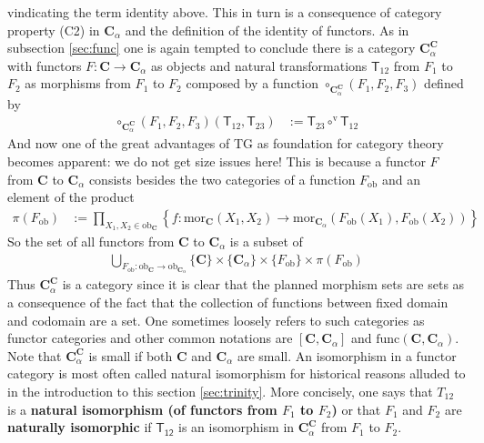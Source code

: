 vindicating the term identity above. This in turn is a consequence of category property (C2) in $\mathbf{C}_{\alpha}$ and the definition of the identity of functors. As in subsection \ref{sec:func} one is again tempted to conclude there is a category $\mathbf{C}_{\alpha}^{\mathbf{C}}$ with functors $F \colon \mathbf{C} \rightarrow \mathbf{C}_{\alpha}$ as objects and natural transformations $\mathsf{T}_{12}$ from $F_{1}$ to $F_{2}$ as morphisms from $F_{1}$ to $F_{2}$ composed by a function $\circ_{\mathbf{C}_{\alpha}^{\mathbf{C}}}(F_{1},F_{2},F_{3})$ defined by
\begin{align*}
  \circ_{\mathbf{C}_{\alpha}^{\mathbf{C}}}(F_{1},F_{2},F_{3})
  (\mathsf{T}_{12},\mathsf{T}_{23})
  &:=
  \mathsf{T}_{23}
  \circ^{\textrm{v}}
  \mathsf{T}_{12}
\end{align*}
And now one of the great advantages of TG as foundation for category theory becomes apparent: we do not get size issues here! This is because a functor $F$ from $\mathbf{C}$ to $\mathbf{C}_{\alpha}$ consists besides the two categories of a function $F_{\mathrm{ob}}$ and an element of the product
\begin{align*}
  \pi(F_{\mathrm{ob}})
  &:=
  \prod_{X_{1},X_{2} \in \mathrm{ob}_{\mathbf{C}}}
  \left\lbrace
    f
    \colon
    \mathrm{mor}_{\mathbf{C}}(X_{1},X_{2})
    \rightarrow
    \mathrm{mor}_{\mathbf{C}_{\alpha}}
    (F_{\mathrm{ob}}(X_{1}),F_{\mathrm{ob}}(X_{2}))
  \right\rbrace
\end{align*}
So the set of all functors from $\mathbf{C}$ to $\mathbf{C}_{\alpha}$ is a subset of
\begin{align*}
  \bigcup_{F_{\mathrm{ob}} \colon \mathrm{ob}_{\mathbf{C}} \rightarrow \mathrm{ob}_{\mathbf{C}_{\alpha}}}
  \lbrace
    \mathbf{C}
  \rbrace
  \times
  \lbrace
    \mathbf{C}_{\alpha}
  \rbrace
  \times
  \lbrace
    F_{\mathrm{ob}}
  \rbrace
  \times
  \pi(F_{\mathrm{ob}})
\end{align*}
Thus $\mathbf{C}_{\alpha}^{\mathbf{C}}$ is a category since it is clear that the planned morphism sets are sets as a consequence of the fact that the collection of functions between fixed domain and codomain are a set. One sometimes loosely refers to such categories as functor categories and other common notations are $[\mathbf{C},\mathbf{C}_{\alpha}]$ and $\mathrm{func}(\mathbf{C},\mathbf{C}_{\alpha})$. Note that $\mathbf{C}_{\alpha}^{\mathbf{C}}$ is small if both $\mathbf{C}$ and $\mathbf{C}_{\alpha}$ are small. An isomorphism in a functor category is most often called natural isomorphism for historical reasons alluded to in the introduction to this section \ref{sec:trinity}. More concisely, one says that $T_{12}$ is a \textbf{natural isomorphism (of functors from $F_{1}$ to $F_{2}$)} or that $F_{1}$ and $F_{2}$ are \textbf{naturally isomorphic} if $\mathsf{T_{12}}$ is an isomorphism in $\mathbf{C}_{\alpha}^{\mathbf{C}}$ from $F_{1}$ to $F_{2}$.
